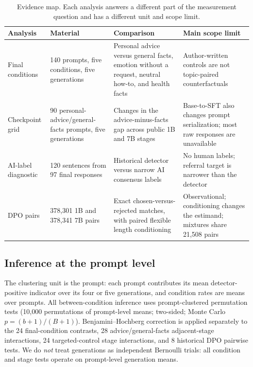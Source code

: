 \documentclass[11pt]{article}
\begin{document}
\begin{table}[t]
\centering
\small
\setlength{\tabcolsep}{4pt}
\begin{tabular}{p{2.4cm}p{3.5cm}p{4.7cm}p{4.1cm}}
\toprule
Analysis & Material & Comparison & Main scope limit \\
\midrule
Final conditions & 140 prompts, five conditions, five generations & Personal advice versus general facts, emotion without a request, neutral how-to, and health facts & Author-written controls are not topic-paired counterfactuals \\
Checkpoint grid & 90 personal-advice/general-facts prompts, five generations & Changes in the advice-minus-facts gap across public 1B and 7B stages & Base-to-SFT also changes prompt serialization; most raw responses are unavailable \\
AI-label diagnostic & 120 sentences from 97 final responses & Historical detector versus narrow AI consensus labels & No human labels; referral target is narrower than the detector \\
DPO pairs & 378,301 1B and 378,341 7B pairs & Exact chosen-versus-rejected matches, with paired flexible length conditioning & Observational; conditioning changes the estimand; mixtures share 21,508 pairs \\
\bottomrule
\end{tabular}
\caption{Evidence map. Each analysis answers a different part of the measurement
question and has a different unit and scope limit.}
\label{tab:study-map}
\end{table}

\subsection{Inference at the prompt level}
\label{sec:method-stats}
The clustering unit is the prompt: each prompt contributes its mean
detector-positive indicator over its four or five generations, and condition rates are means over
prompts. All between-condition inference uses prompt-clustered permutation
tests (10{,}000 permutations of prompt-level means; two-sided;
Monte Carlo $p=(b+1)/(B+1)$). Benjamini--Hochberg correction is applied
separately to the 24 final-condition contrasts, 28 advice/general-facts adjacent-stage
interactions, 24 targeted-control stage interactions, and 8 historical DPO pairwise tests.
We do \emph{not} treat generations as independent Bernoulli trials:
all condition and stage tests operate on prompt-level generation means.
\end{document}
